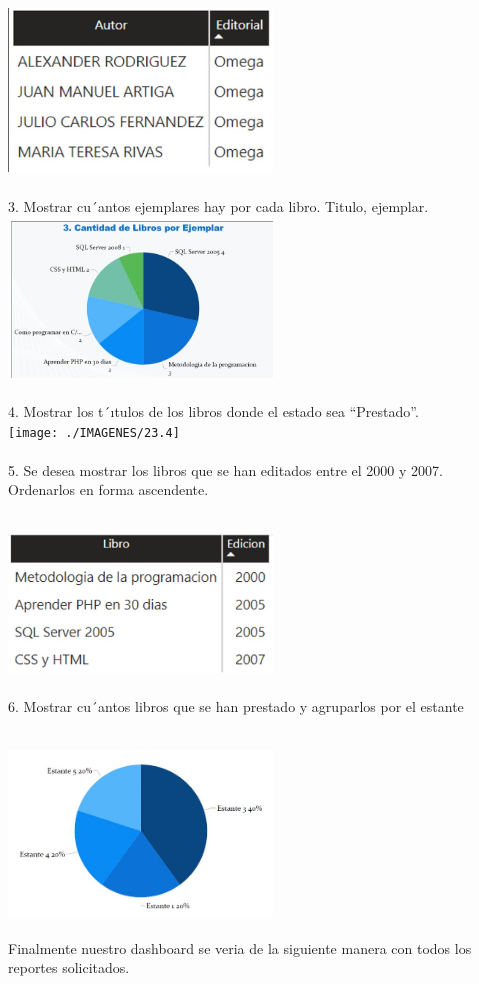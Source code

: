 \documentclass[preprint,12pt]{elsarticle}
\begin{document}
\begin{itemize}
			\\ \includegraphics[width=7cm]{./IMAGENES/3.2} \\
	\\  	3.	Mostrar cu´antos ejemplares hay por cada libro.   Titulo, ejemplar.
			\\ \includegraphics[width=7cm]{./IMAGENES/3.3} \\
		
	\\  	4.	Mostrar los   t´ıtulos de los libros donde el estado sea “Prestado”.
		\\ \texttt{[image: ./IMAGENES/23.4]} \\
	\\  	5.	Se desea mostrar los libros que se han editados entre el 2000 y 2007. Ordenarlos en forma ascendente.
		
			\\ \includegraphics[width=7cm]{./IMAGENES/3.5} \\
	\\ 	6.	Mostrar cu´antos libros que se han prestado y agruparlos por el estante
		
			\\ \includegraphics[width=7cm]{./IMAGENES/3.6} \\
	\\  	Finalmente nuestro dashboard se veria de la siguiente manera con todos los reportes solicitados.
		

\end{itemize}
\end{document}

